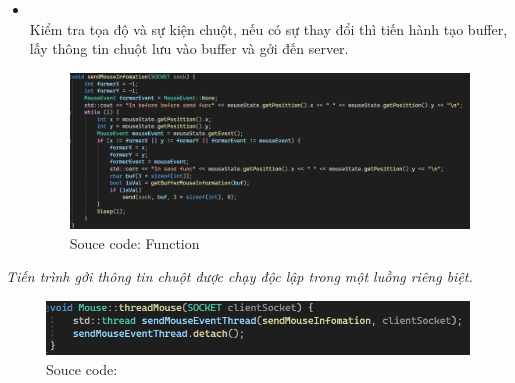 \begin{itemize}
\begin{itemize}
\begin{figure}[H]
		\end{figure}
		\item \textbf{}\\
	Kiểm tra tọa độ và sự kiện chuột, nếu có sự thay đổi thì tiến hành tạo buffer, lấy thông tin chuột lưu vào buffer và gởi đến server.
	\begin{figure}[H]
		\begin{center}
			\includegraphics[scale=0.66]{img/sendMouse}
                  \caption{Souce code: Function \textbf{}}
		\end{center}
	\end{figure}
	\end{itemize}
	 \textit{Tiến trình gởi thông tin chuột được chạy độc lập trong một luồng riêng biệt.}
		\begin{figure}[H]
		\begin{center}
			\includegraphics[scale=1]{img/mouseThread}
                \caption{Souce code: \textbf{}}
		\end{center}
		
	\end{figure}
\end{itemize}










